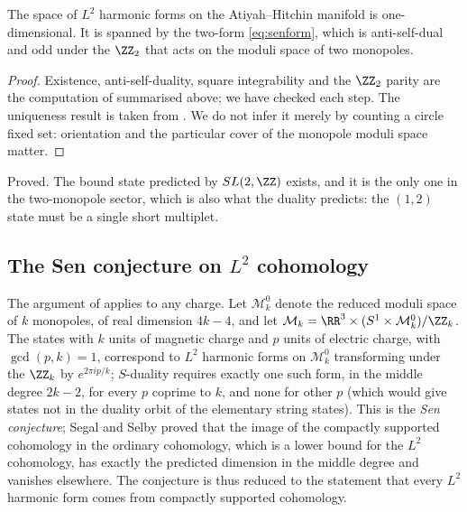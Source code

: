\begin{theorem}\label{thm:atiyahhitchin}
The space of $L^2$ harmonic forms on the Atiyah--Hitchin manifold is one-dimensional. It is spanned by the two-form \eqref{eq:senform}, which is anti-self-dual and odd under the $\ZZ_2$ that acts on the moduli space of two monopoles.
\end{theorem}

\begin{proof}
Existence, anti-self-duality, square integrability and the $\ZZ_2$ parity are the computation of \cite{Sen94dyon} summarised above; we have checked each step. The uniqueness result is taken from \cite{Hitchin00}. We do not infer it merely by counting a circle fixed set: orientation and the particular cover of the monopole moduli space matter.
\end{proof}

\begin{verdict}[claim 2]
Proved. The bound state predicted by $SL(2,\ZZ)$ exists, and it is the only one in the two-monopole sector, which is also what the duality predicts: the $(1,2)$ state must be a single short multiplet.
\end{verdict}

\subsection{The Sen conjecture on $L^2$ cohomology}\label{ssec:senconjecture}

The argument of \cite{Sen94dyon} applies to any charge. Let $\mathcal M_k^0$ denote the reduced moduli space of $k$ monopoles, of real dimension $4k-4$, and let $\mathcal M_k = \RR^3\times(S^1\times\mathcal M^0_k)/\ZZ_k$. The states with $k$ units of magnetic charge and $p$ units of electric charge, with $\gcd(p,k)=1$, correspond to $L^2$ harmonic forms on $\mathcal M^0_k$ transforming under the $\ZZ_k$ by $e^{2\pi i p/k}$; $S$-duality requires exactly one such form, in the middle degree $2k-2$, for every $p$ coprime to $k$, and none for other $p$ (which would give states not in the duality orbit of the elementary string states). This is the \emph{Sen conjecture}; Segal and Selby \cite{SegalSelby96} proved that the image of the compactly supported cohomology in the ordinary cohomology, which is a lower bound for the $L^2$ cohomology, has exactly the predicted dimension in the middle degree and vanishes elsewhere. The conjecture is thus reduced to the statement that every $L^2$ harmonic form comes from compactly supported cohomology.

